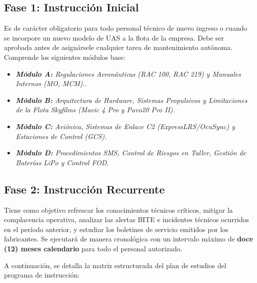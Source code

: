 \subsection{Fase 1: Instrucción Inicial}
Es de carácter obligatorio para todo personal técnico de nuevo ingreso o cuando se incorpore un nuevo modelo de UAS a la flota de la empresa. Debe ser aprobada antes de asignársele cualquier tarea de mantenimiento autónoma. Comprende los siguientes módulos base:
\begin{itemize}
    \item \textit{\textbf{Módulo A:} Regulaciones Aeronáuticas (RAC 100, RAC 219) y Manuales Internos (MO, MCM).}.
    \item \textit{\textbf{Módulo B:} Arquitectura de Hardware, Sistemas Propulsivos y Limitaciones de la Flota Skyfilms (Mavic 4 Pro y Pavo20 Pro II).}
    \item \textit{\textbf{Módulo C:} Aviónica, Sistemas de Enlace C2 (ExpressLRS/OcuSync) y Estaciones de Control (GCS).} 
    \item \textit{\textbf{Módulo D:} Procedimientos SMS, Control de Riesgos en Taller, Gestión de Baterías LiPo y Control FOD.}
\end{itemize}

\subsection{Fase 2: Instrucción Recurrente}
Tiene como objetivo refrescar los conocimientos técnicos críticos, mitigar la complacencia operativa, analizar las alertas BITE e incidentes técnicos ocurridos en el período anterior, y estudiar los boletines de servicio emitidos por los fabricantes. Se ejecutará de manera cronológica con un intervalo máximo de \textbf{doce (12) meses calendario} para todo el personal autorizado.

A continuación, se detalla la matriz estructurada del plan de estudios del programa de instrucción:

